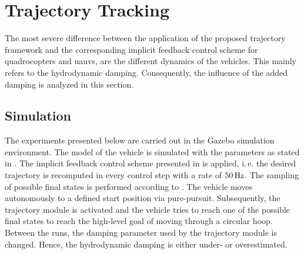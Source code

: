 \section{Trajectory Tracking}

The most severe difference between the application of the proposed trajectory framework and the corresponding implicit feedback control scheme for quadrocopters and \acp{uauv}, are the different dynamics of the vehicles. This mainly refers to the hydrodynamic damping. Consequently, the influence of the added damping is analyzed in this section.

\subsection{Simulation}

The experiments presented below are carried out in the Gazebo simulation environment. The model of the vehicle is simulated with the parameters as stated in . The implicit feedback control scheme presented in  is applied, i.\,e. the desired trajectory is recomputed in every control step with a rate of $\unit[50]{Hz}$. The sampling of possible final states is performed according to . 
The vehicle moves autonomously to a defined start position via pure-pursuit.
Subsequently, the trajectory module is activated and the vehicle tries to reach one of the possible final states to reach the high-level goal of moving through a circular hoop.
Between the runs, the damping parameter used by the trajectory module is changed. Hence, the hydrodynamic damping is either under- or overestimated.

